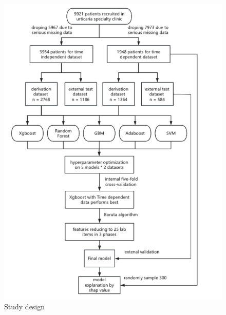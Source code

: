 \documentclass[final,1p,times,authoryear]{elsarticle}
\begin{document}
\begin{figure}[t]
    \centering
    \includegraphics[width=\textwidth]{figures/protocol.png}
    \caption{Study design}\label{protocol}
\end{figure}
\end{document}
